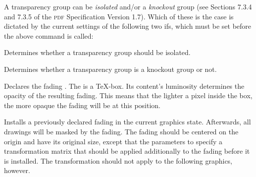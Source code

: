 A transparency group can be \emph{isolated} and/or a \emph{knockout}
group (see Sections 7.3.4 and 7.3.5 of the \textsc{pdf}
Specification Version 1.7). Which of these is the case is dictated
by the current settings of the following two ifs, which must be set
before the above command is called:
  
{\let\ifpgfsys@transparency@group@isolated=\relax
\begin{command}{\ifpgfsys@transparency@group@isolated}
  Determines whether a transparency group should be isolated. 
\end{command}
}

{\let\ifpgfsys@transparency@group@knockout=\relax
\begin{command}{\ifpgfsys@transparency@group@knockout}
  Determines whether a transparency group is a knockout group or not. 
\end{command}
}


  
\begin{command}{\pgfsys@fadingfrombox{}}
  Declares the fading . The  is a \TeX-box. Its
  content's luminosity determines the opacity of the resulting
  fading. This means that the lighter a pixel inside the box, the more
  opaque the fading will be at this position.
\end{command}

\begin{command}{\pgfsys@usefading{}}
  Installs a previously declared fading  in the current
  graphics state. Afterwards, all drawings will be masked by the
  fading. The fading should be centered on the origin and have its
  original size, except that the parameters  to 
  specify a transformation matrix that should be applied additionally
  to the fading before it is installed. The transformation should not
  apply to the following graphics, however.
\end{command}


